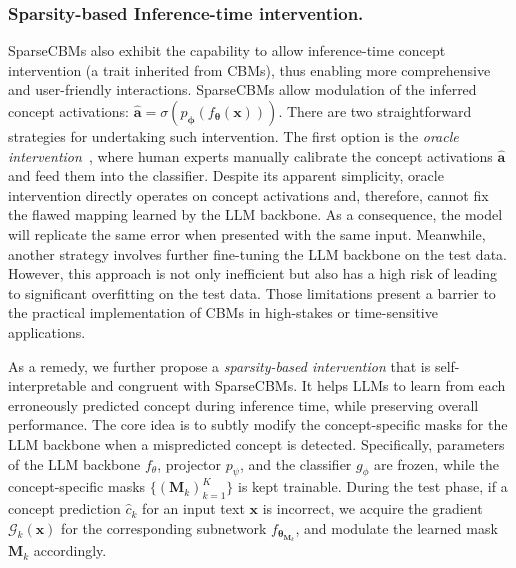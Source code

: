 \documentclass[letterpaper]{article} %
\begin{document}
\subsubsection{Sparsity-based Inference-time intervention.} SparseCBMs also exhibit the capability to allow inference-time concept intervention (a trait inherited from CBMs), thus enabling more comprehensive and user-friendly interactions.
SparseCBMs allow modulation of the inferred concept activations: $\hat{\bm{a}} = \sigma (p_{\bm\phi}(f_{\bm{\theta}}(\bm{x})))$. There are two straightforward strategies for undertaking such intervention. The first option is the \textit{oracle intervention}~\citep{koh2020concept}, where human experts manually calibrate the concept activations $\hat{\bm{a}}$ and feed them into the classifier.
Despite its apparent simplicity, oracle intervention directly operates on concept activations and, therefore, cannot fix the flawed mapping learned by the LLM backbone. As a consequence, the model will replicate the same error when presented with the same input. Meanwhile, another strategy involves further fine-tuning the LLM backbone on the test data. However, this approach is not only inefficient but also has a high risk of leading to significant overfitting on the test data. Those limitations present a barrier to the practical implementation of CBMs in high-stakes or time-sensitive applications.

As a remedy, we further propose a \textit{sparsity-based intervention} that is self-interpretable and congruent with SparseCBMs. It helps LLMs to learn from each erroneously predicted concept during inference time, while preserving overall performance. The core idea is to subtly modify the concept-specific masks for the LLM backbone when a mispredicted concept is detected. Specifically, parameters of the LLM backbone $f_\theta$, projector $p_\psi$, and the classifier $g_\phi$ are frozen, while the concept-specific masks $\{(\bm{M}_k)_{k=1}^K\}$ is kept trainable. During the test phase, if a concept prediction $\hat{c}_k$ for an input text $\bm{x}$ is incorrect, we acquire the gradient ${\mathcal{G}_k}(\bm{x})$ for the corresponding subnetwork $f_{\bm{\theta}_{\bm{M}_k}}$, and modulate the learned mask $\bm{M}_k$ accordingly.
\end{document}
